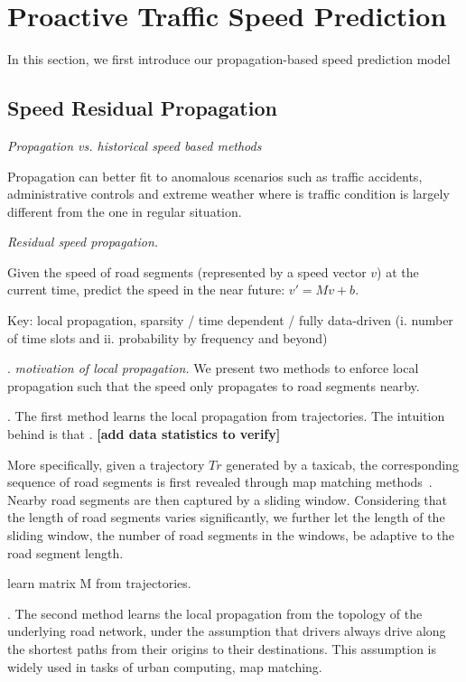 \section{Proactive Traffic Speed Prediction}
\label{sec-method}


In this section, we first introduce our propagation-based speed prediction model


\subsection{Speed Residual Propagation}
\label{subsec-propagation}

{\em Propagation vs. historical speed based methods}

Propagation can better fit to anomalous scenarios such as traffic accidents, administrative controls and extreme weather where is traffic condition is largely different from the one in regular situation.

{\em Residual speed propagation.}

Given the speed of road segments (represented by a speed vector $v$) at the current time, predict the speed in the near future: $v'=Mv+b$.

Key: local propagation, \ie sparsity / time dependent / fully data-driven (i. number of time slots and ii. probability by frequency and beyond)


.
{\em motivation of local propagation.}
We present two methods to enforce local propagation such that the speed only propagates to road segments nearby.

.
The first method learns the local propagation from trajectories. The intuition behind is that {\em }. {\bf [add data statistics to verify]}

More specifically, given a trajectory $Tr$ generated by a taxicab, the corresponding sequence of road segments is first revealed through map matching methods~\cite{Newson2009MM}. Nearby road segments are then captured by a sliding window. Considering that the length of road segments varies significantly, we further let the length of the sliding window, \ie the number of road segments in the windows, be adaptive to the road segment length.

\begin{example}
learn matrix M from trajectories.
\end{example}

.
The second method learns the local propagation from the topology of the underlying road network, under the assumption that drivers always drive along the shortest paths from their origins to their destinations. This assumption is widely used in tasks of urban computing, \eg map matching.

